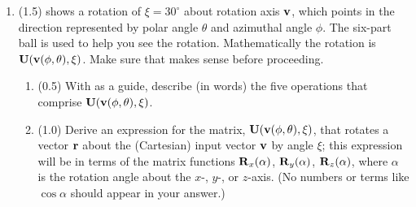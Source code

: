 \documentclass[11pt,titlepage,fleqn]{article}
\newcommand{\rotangA}{\alpha}
\newcommand{\rotangB}{\xi}    %
\newcommand{\rotvec}{\bv}      %
\begin{document}
\begin{enumerate}
\item (1.5)  shows a rotation of $\rotangB = 30^\circ$ about rotation axis $\rotvec$, which points in the direction represented by polar angle $\theta$ and azimuthal angle $\phi$. The six-part ball is used to help you see the rotation. Mathematically the rotation is $\bU(\rotvec(\phi,\theta),\rotangB)$. Make sure that  makes sense before proceeding.
%
\begin{enumerate}
\item (0.5) With  as a guide, describe (in words) the five operations that comprise $\bU(\rotvec(\phi,\theta),\rotangB)$.

\item (1.0) Derive an expression for the matrix, $\bU(\rotvec(\phi,\theta),\rotangB)$, that rotates a vector $\mbox{${\bf r}$}$ about the (Cartesian) input vector $\rotvec$ by angle $\rotangB$; this expression will be in terms of the matrix functions $\bR_x(\rotangA)$, $\bR_y(\rotangA)$, $\bR_z(\rotangA)$, where $\rotangA$ is the rotation angle about the $x$-, $y$-, or $z$-axis. (No numbers or terms like $\cos\rotangA$ should appear in your answer.)

\end{enumerate}


\end{enumerate}
\end{document}
